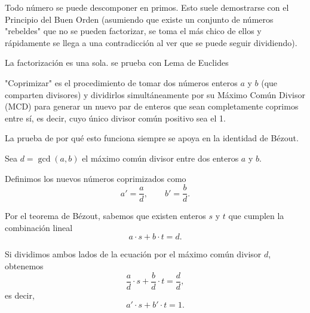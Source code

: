 \begin{teoria}[title=El Teorema Fundamental de la Aritmética (TFA)]
\begin{listapropiedades}
  \item[Existencia]Todo número se puede descomponer en primos. Esto suele demostrarse con el Principio del Buen Orden (asumiendo que existe un conjunto de números "rebeldes" que no se pueden factorizar, se toma el más chico de ellos y rápidamente se llega a una contradicción al ver que se puede seguir dividiendo).
  \item[Unicidad]La factorización es una sola. se prueba con Lema de Euclides 
\end{listapropiedades}
\end{teoria}

\begin{teoria}[title=Coprimizar]
"Coprimizar" es el procedimiento de tomar dos números enteros 
$a$ y $b$ (que comparten divisores) y dividirlos simultáneamente por su 
Máximo Común Divisor (MCD) para generar un nuevo par de enteros que sean 
completamente coprimos entre sí, es decir, cuyo único divisor común 
positivo sea el 1.
\end{teoria}

\begin{demostracion}
    La prueba de por qué esto funciona siempre se apoya en la identidad de Bézout.

    Sea $d = \gcd(a, b)$ el máximo común divisor entre dos enteros $a$ y $b$.

    Definimos los nuevos números coprimizados como
    \[
        a' = \frac{a}{d}, \qquad b' = \frac{b}{d}.
    \]

    Por el teorema de Bézout, sabemos que existen enteros $s$ y $t$ que cumplen la combinación lineal
    \[
        a \cdot s + b \cdot t = d.
    \]

    Si dividimos ambos lados de la ecuación por el máximo común divisor $d$, obtenemos
    \[
        \frac{a}{d} \cdot s + \frac{b}{d} \cdot t = \frac{d}{d},
    \] 
    es decir,
    \[
        a' \cdot s + b' \cdot t = 1.
    \]
\end{demostracion}